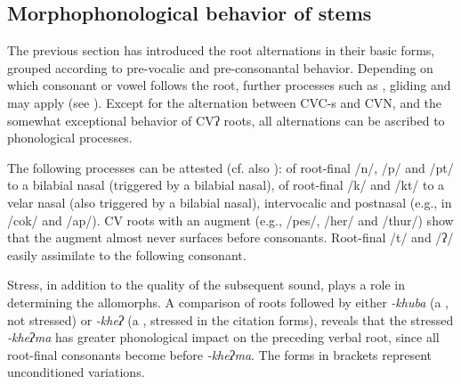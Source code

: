 \subsection{Morphophonological behavior of stems}\label{stem-2}

The previous section has introduced the root alternations in their basic forms, grouped according to pre-vocalic and pre-consonantal behavior. Depending on which consonant or vowel follows the root, further processes such as , gliding and  may apply (see ).  Except for the alternation between CVC-s and CVN, and the somewhat exceptional behavior of CVʔ roots, all alternations can be ascribed to phonological processes.

The following processes can be attested (cf. also ):  of root-final /n/, /p/ and /pt/ to a bilabial nasal (triggered by a bilabial nasal),  of root-final /k/ and /kt/ to  a velar nasal (also triggered by a bilabial nasal), intervocalic and postnasal  (e.g., in /cok/ and /ap/). CV roots with an augment (e.g., /pes/, /her/ and /thur/) show that the augment almost never surfaces before consonants. Root-final /t/ and /ʔ/ easily assimilate to the following consonant.

Stress, in addition to the quality of the subsequent sound, plays a role in determining the allomorphs. A comparison of roots followed by either \emph{-khuba} (a , not stressed) or \emph{-kheʔ} (a , stressed in the citation forms), reveals that the stressed \emph{-kheʔma} has greater phonological impact on the preceding verbal root, since all root-final consonants become  before \emph{-kheʔma}. The forms in brackets represent unconditioned variations.

